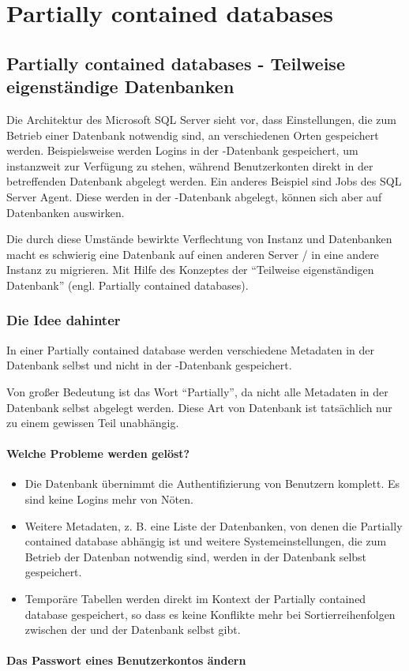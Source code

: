   \chapter{Partially contained databases}
    \setcounter{page}{1}
    \minitoc
\newpage
    \section{Partially contained databases - Teilweise eigenständige
    Datenbanken} 
      Die Architektur des Microsoft SQL Server sieht vor, dass Einstellungen,
      die zum Betrieb einer Datenbank notwendig sind, an verschiedenen Orten
      gespeichert werden. Beispielsweise werden Logins in der
      -Datenbank gespeichert, um instanzweit zur Verfügung zu
      stehen, während Benutzerkonten direkt in der betreffenden Datenbank
      abgelegt werden. Ein anderes Beispiel sind Jobs des SQL Server Agent.
      Diese werden in der -Datenbank abgelegt, können sich aber
      auf Datenbanken auswirken.
      
      Die durch diese Umstände bewirkte Verflechtung von Instanz und Datenbanken
      macht es schwierig eine Datenbank auf einen anderen Server / in eine
      andere Instanz zu migrieren. Mit Hilfe des Konzeptes der
      \enquote{Teilweise eigenständigen Datenbank} (engl. Partially contained
      databases).
      \subsection{Die Idee dahinter}
        In einer Partially contained database werden verschiedene Metadaten
        in der Datenbank selbst und nicht in der -Datenbank
        gespeichert.
        \begin{merke}
          Von großer Bedeutung ist das Wort \enquote{Partially}, da nicht alle
          Metadaten in der Datenbank selbst abgelegt werden. Diese Art von
          Datenbank ist tatsächlich nur zu einem gewissen Teil unabhängig.
        \end{merke}
        \subsubsection{Welche Probleme werden gelöst?}
          \begin{itemize}
            \item Die Datenbank übernimmt die Authentifizierung von Benutzern
            komplett. Es sind keine Logins mehr von Nöten.
            \item Weitere Metadaten, z. B. eine Liste der Datenbanken, von denen
            die Partially contained database abhängig ist und weitere
            Systemeinstellungen, die zum Betrieb der Datenban notwendig
            sind, werden in der Datenbank selbst gespeichert.
            \item Temporäre Tabellen werden direkt im Kontext der Partially
            contained database gespeichert, so dass es keine Konflikte mehr bei
            Sortierreihenfolgen zwischen der  und der
            Datenbank selbst gibt.
          \end{itemize}
          
          \subsubsection{Das Passwort eines Benutzerkontos ändern}
